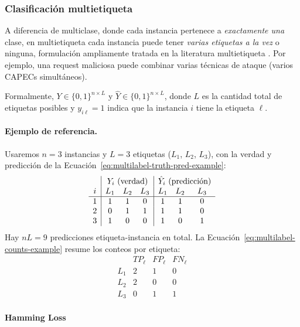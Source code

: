 \documentclass[12pt,oneside]{report}
\begin{document}
\subsubsection{Clasificación multietiqueta}

A diferencia de multiclase, donde cada instancia pertenece a
\emph{exactamente una} clase, en multietiqueta cada instancia puede
tener \emph{varias etiquetas a la vez} o ninguna, formulación ampliamente tratada en la literatura multietiqueta \cite{tsoumakas_multilabel_overview,read2011}. Por ejemplo, una
request maliciosa puede combinar varias técnicas de ataque (varios
CAPECs simultáneos).

Formalmente, $Y\in\{0,1\}^{n\times L}$ y $\hat{Y}\in\{0,1\}^{n\times L}$,
donde $L$ es la cantidad total de etiquetas posibles y $y_{i\ell}=1$
indica que la instancia $i$ tiene la etiqueta $\ell$.

\paragraph{Ejemplo de referencia.} Usaremos $n=3$ instancias y $L=3$
etiquetas ($L_1$, $L_2$, $L_3$), con la verdad y predicción de la Ecuación~\eqref{eq:multilabel-truth-pred-example}:
\begin{equation}
\label{eq:multilabel-truth-pred-example}
\begin{array}{c|ccc|ccc}
 & \multicolumn{3}{c|}{Y_i\ \text{(verdad)}} & \multicolumn{3}{c}{\hat Y_i\ \text{(predicción)}} \\
i & L_1 & L_2 & L_3 & L_1 & L_2 & L_3 \\
\hline
1 & 1 & 1 & 0 & 1 & 1 & 0 \\
2 & 0 & 1 & 1 & 1 & 1 & 0 \\
3 & 1 & 0 & 0 & 1 & 0 & 1
\end{array}
\end{equation}
Hay $nL=9$ predicciones etiqueta-instancia en total. La Ecuación~\eqref{eq:multilabel-counts-example} resume los conteos por etiqueta:
\begin{equation}
\label{eq:multilabel-counts-example}
\begin{array}{l|ccc}
 & TP_\ell & FP_\ell & FN_\ell \\
\hline
L_1 & 2 & 1 & 0 \\
L_2 & 2 & 0 & 0 \\
L_3 & 0 & 1 & 1
\end{array}
\end{equation}

\paragraph{Hamming Loss}
\end{document}
